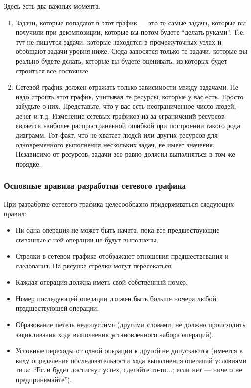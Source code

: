 \documentclass{../../text-style}
\begin{document}
Здесь есть два важных момента.

\begin{enumerate}
    \item Задачи, которые попадают в этот график --- это те самые задачи, которые вы получили при декомпозиции, которые вы потом будете \enquote{делать руками}. Т.е. тут не пишутся задачи, которые находятся в промежуточных узлах и обобщают задачи уровня ниже. Сюда заносятся только те задачи, которые вы реально будете делать, которые вы будете оценивать, из которых будет строиться все состояние.
    \item Сетевой график должен отражать только зависимости между задачами. Не надо строить этот график, учитывая те ресурсы, которые у вас есть. Просто забудьте о них. Представьте, что у вас есть неограниченное число людей, денег и т.д. Изменение сетевых графиков из-за ограничений ресурсов является наиболее распространенной ошибкой при построении такого рода диаграмм. Тот факт, что не хватает людей или других ресурсов для одновременного выполнения нескольких задач, не имеет значения. Независимо от ресурсов, задачи все равно должны выполняться в том же порядке.
\end{enumerate}

\subsubsection{Основные правила разработки сетевого графика}

При разработке сетевого графика целесообразно придерживаться следующих правил:

\begin{itemize}
    \item Ни одна операция не может быть начата, пока все предшествующие связанные с ней операции не будут выполнены.
    \item Стрелки в сетевом графике отображают отношения предшествования и следования. На рисунке стрелки могут пересекаться.
    \item Каждая операция должна иметь свой собственный номер.
    \item Номер последующей операции должен быть больше номера любой предшествующей операции.
    \item Образование петель недопустимо (другими словами, не должно происходить зацикливания хода выполнения установленного набора операций).
    \item Условные переходы от одной операции к другой не допускаются (имеется в виду определение последовательности хода выполнения операций условиями типа: \enquote{Если будет достигнут успех, сделайте то-то...; если нет --- ничего не предпринимайте}).
\end{itemize}
\end{document}
